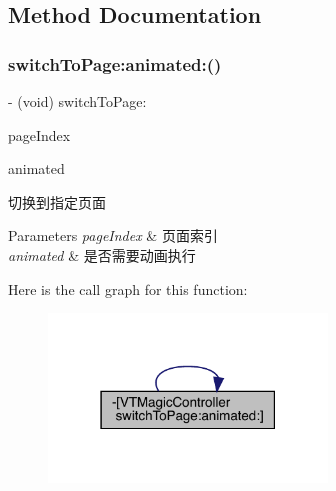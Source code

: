 \subsection{Method Documentation}
\mbox{\label{interface_v_t_magic_controller_aa1d4db425d8e4c189aabba581bec2c7f}} 
\subsubsection{\texorpdfstring{switch\+To\+Page\+:animated\+:()}{switchToPage:animated:()}\hspace{0.1cm}{\footnotesize\ttfamily [1/3]}}
{\footnotesize\ttfamily -\/ (void) switch\+To\+Page\+: \begin{DoxyParamCaption}\item[{(N\+S\+U\+Integer)}]{page\+Index }\item[{animated:(B\+O\+OL)}]{animated }\end{DoxyParamCaption}}

切换到指定页面


\begin{DoxyParams}{Parameters}
{\em page\+Index} & 页面索引 \\
\hline
{\em animated} & 是否需要动画执行 \\
\hline
\end{DoxyParams}
Here is the call graph for this function\+:\nopagebreak
\begin{figure}[H]
\begin{center}
\leavevmode
\includegraphics[width=210pt]{interface_v_t_magic_controller_aa1d4db425d8e4c189aabba581bec2c7f_cgraph}
\end{center}
\end{figure}
\mbox{\label{interface_v_t_magic_controller_aa1d4db425d8e4c189aabba581bec2c7f}} 
